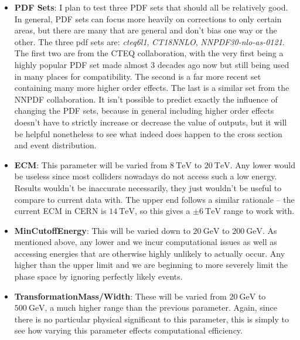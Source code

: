\begin{itemize}
\item \textbf{PDF Sets}: I plan to test three PDF sets that should all be relatively good. In general, PDF sets can focus more heavily on corrections to only certain areas, but there are many that are general and don't bias one way or the other. The three pdf sets are: \textit{cteq6l1}, \textit{CT18NNLO}, \textit{NNPDF30-nlo-as-0121}. The first two are from the CTEQ collaboration, with the very first being a highly popular PDF set made almost 3 decades ago now but still being used in many places for compatibility. The second is a far more recent set containing many more higher order effects. The last is a similar set from the NNPDF collaboration. It isn't possible to predict exactly the influence of changing the PDF sets, because in general including higher order effects doesn't have to strictly increase or decrease the value of outputs, but it will be helpful nonetheless to see what indeed does happen to the cross section and event distribution.
\item \textbf{ECM}: This parameter will be varied from $\qty{8}{\tera\electronvolt}$ to $\qty{20}{\tera\electronvolt}$. Any lower would be useless since most colliders nowadays do not access such a low energy. Results wouldn't be inaccurate necessarily, they just wouldn't be useful to compare to current data with. The upper end follows a similar rationale -- the current ECM in CERN is $\qty{14}{\tera\electronvolt}$, so this gives a $\pm\qty{6}{\tera\electronvolt}$ range to work with.
\item \textbf{MinCutoffEnergy}: This will be varied down to $\qty{20}{\giga\electronvolt}$ to $\qty{200}{\giga\electronvolt}$. As mentioned above, any lower and we incur computational issues as well as accessing energies that are otherwise highly unlikely to actually occur. Any higher than the upper limit and we are beginning to more severely limit the phase space by ignoring perfectly likely events.
\item \textbf{TransformationMass/Width}: These will be varied from $\qty{20}{\giga\electronvolt}$ to $\qty{500}{\giga\electronvolt}$, a much higher range than the previous parameter. Again, since there is no particular physical significant to this parameter, this is simply to see how varying this parameter effects computational efficiency.
\end{itemize}

